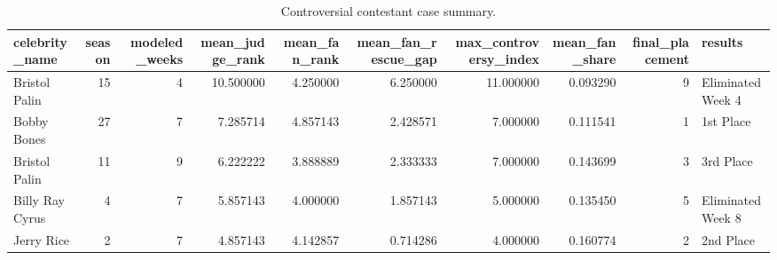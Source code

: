 \begin{table}
\caption{Controversial contestant case summary.}
\begin{tabular}{lrrrrrrrrl}
\toprule
celebrity\_name & season & modeled\_weeks & mean\_judge\_rank & mean\_fan\_rank & mean\_fan\_rescue\_gap & max\_controversy\_index & mean\_fan\_share & final\_placement & results \\
\midrule
Bristol Palin & 15 & 4 & 10.500000 & 4.250000 & 6.250000 & 11.000000 & 0.093290 & 9 & Eliminated Week 4 \\
Bobby Bones & 27 & 7 & 7.285714 & 4.857143 & 2.428571 & 7.000000 & 0.111541 & 1 & 1st Place \\
Bristol Palin & 11 & 9 & 6.222222 & 3.888889 & 2.333333 & 7.000000 & 0.143699 & 3 & 3rd Place \\
Billy Ray Cyrus & 4 & 7 & 5.857143 & 4.000000 & 1.857143 & 5.000000 & 0.135450 & 5 & Eliminated Week 8 \\
Jerry Rice & 2 & 7 & 4.857143 & 4.142857 & 0.714286 & 4.000000 & 0.160774 & 2 & 2nd Place \\
\bottomrule
\end{tabular}
\end{table}
